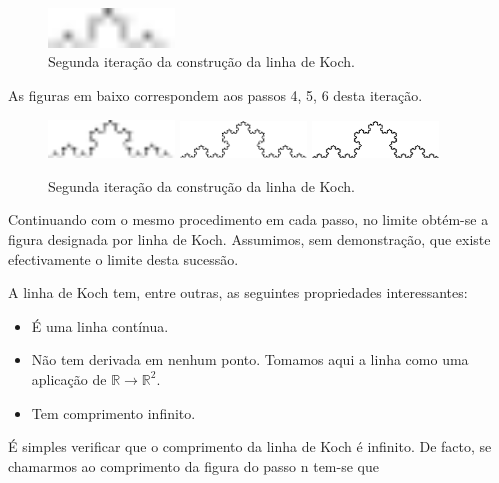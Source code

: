 \documentclass[11pt]{article}
\begin{document}
\begin{figure}[H]
  \centering
  \includegraphics[width=0.3\textwidth]{../images/koch-line-02.pdf}
  \caption{Segunda iteração da construção da linha de Koch.}
\end{figure}


As figuras em baixo correspondem aos passos 4, 5, 6 desta iteração.

\begin{figure}[H]
  \centering
  \hfill
  \includegraphics[width=0.3\textwidth]{../images/koch-line-03.pdf}
  \hfill
  \includegraphics[width=0.3\textwidth]{../images/koch-line-04.pdf}
  \hfill
  \includegraphics[width=0.3\textwidth]{../images/koch-line-05.pdf}
  \hfill
  \caption{Segunda iteração da construção da linha de Koch.}
\end{figure}


Continuando com o mesmo procedimento em cada passo, no limite obtém-se
a figura designada por linha de Koch. Assumimos, sem demonstração, que
existe efectivamente o limite desta sucessão.

A linha de Koch tem, entre outras, as seguintes propriedades
interessantes:


\begin{itemize}

\item É uma linha contínua.

\item Não tem derivada em nenhum ponto. Tomamos aqui a linha como uma
  aplicação de $\mathbb{R} \to \mathbb{R}^2$.

\item Tem comprimento infinito.

\end{itemize}


É simples verificar que o comprimento da linha de Koch é infinito. De
facto, se chamarmos ao comprimento da figura do passo n tem-se que
\end{document}
